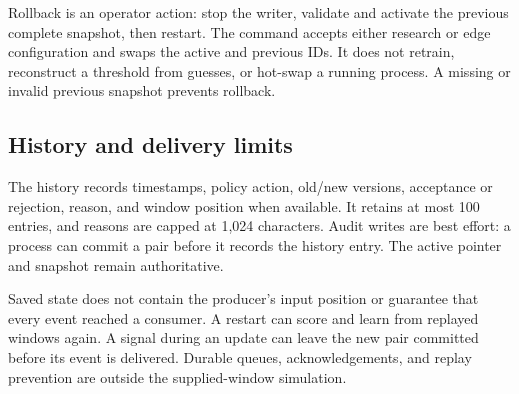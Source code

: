Rollback is an operator action: stop the writer, validate and activate the
previous complete snapshot, then restart. The command accepts either research
or edge configuration and swaps the active and previous IDs. It does not
retrain, reconstruct a threshold from guesses, or hot-swap a running process.
A missing or invalid previous snapshot prevents rollback.

\subsection{History and delivery limits}

The history records timestamps, policy action, old/new versions, acceptance or
rejection, reason, and window position when available. It retains at most 100
entries, and reasons are capped at 1,024 characters. Audit writes are best
effort: a process can commit a pair before it records the history entry.
The active pointer and snapshot remain authoritative.

Saved state does not contain the producer's input position or guarantee that
every event reached a consumer. A restart can score and learn from replayed
windows again. A signal during an update can leave the new pair committed
before its event is delivered. Durable queues, acknowledgements, and replay
prevention are outside the supplied-window simulation.
